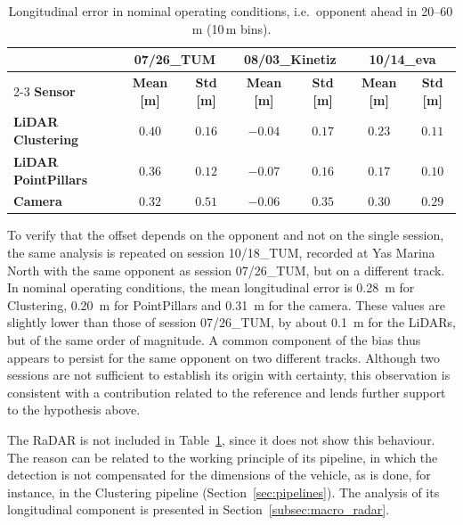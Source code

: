\begin{table}[H]
    \centering
    \small
    \setlength{\tabcolsep}{4pt}
    \begin{tabular}{|lcccccc|}
        \hline
        \rowcolor{bluepoli!40} &\multicolumn{2}{c}{\textbf{07/26\_TUM}}&\multicolumn{2}{c}{\textbf{08/03\_Kinetiz}}&\multicolumn{2}{c|}{\textbf{10/14\_eva}} \\
        \cline{2-3}\cline{4-5}\cline{6-7}
        \rowcolor{bluepoli!40} \textbf{Sensor} & \textbf{Mean [m]} & \textbf{Std [m]} & \textbf{Mean [m]} & \textbf{Std [m]} & \textbf{Mean [m]} & \textbf{Std [m]} \\
        \hline\hline
        \textbf{LiDAR Clustering} & $0.40$ & $0.16$ & $-0.04$ & $0.17$ & $0.23$ & $0.11$ \\
        \textbf{LiDAR PointPillars} & $0.36$ & $0.12$ & $-0.07$ & $0.16$ & $0.17$ & $0.10$ \\
        \textbf{Camera} & $0.32$ & $0.51$ & $-0.06$ & $0.35$ & $0.30$ & $0.29$ \\
        \hline
    \end{tabular}
    \caption{Longitudinal error in nominal operating conditions, i.e.\ opponent ahead in 20--60\,m (10\,m bins).}
    \label{tab:det_long}
\end{table}

To verify that the offset depends on the opponent and not on the single session, the same
analysis is repeated on session 10/18\_TUM, recorded at Yas Marina North with the same
opponent as session 07/26\_TUM, but on a different track. In nominal operating conditions,
the mean longitudinal error is \SI{0.28}{m} for Clustering, \SI{0.20}{m} for PointPillars
and \SI{0.31}{m} for the camera. These values are slightly lower than those of session
07/26\_TUM, by about \SI{0.1}{m} for the LiDARs, but of the same order of magnitude. A common
component of the bias thus appears to persist for the same opponent on two different tracks. Although two sessions are not sufficient to establish
its origin with certainty, this observation is consistent with a contribution related to the
reference and lends further support to the hypothesis above.

The RaDAR is not included in Table~\ref{tab:det_long}, since it does not show this
behaviour. The reason can be related to the working principle of its pipeline, in which the
detection is not compensated for the dimensions of the vehicle, as is done, for instance, in
the Clustering pipeline (Section~\ref{sec:pipelines}). The analysis of its longitudinal
component is presented in Section~\ref{subsec:macro_radar}.



